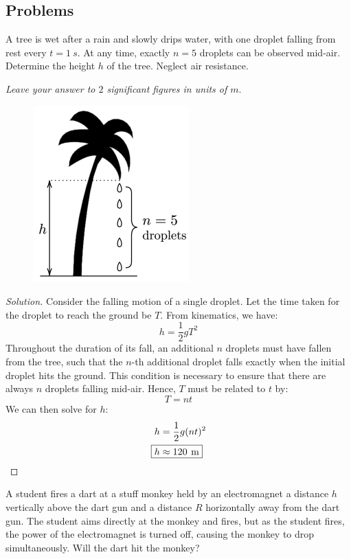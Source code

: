 \subsection{Problems}
\begin{prbm}
A tree is wet after a rain and slowly drips water, with one droplet falling from rest every $t=1\:\unit{s}$. At any time, exactly $n=5$ droplets can be observed mid-air. Determine the height $h$ of the tree. Neglect air resistance.

\textit{Leave your answer to $2$ significant figures in units of $\unit{m}$}.

\begin{figure}[H]
    \centering
    \includegraphics{images/Wet_Tree.png}
\end{figure}
\end{prbm}

\begin{proof}[Solution]
Consider the falling motion of a single droplet. Let the time taken for the droplet to reach the ground be $T$. From kinematics, we have:
\[ h = \frac{1}{2}gT^2 \]
Throughout the duration of its fall, an additional $n$ droplets must have fallen from the tree, such that the $n$-th additional droplet falls exactly when the initial droplet hits the ground. This condition is necessary to ensure that there are always $n$ droplets falling mid-air. Hence, $T$ must be related to $t$ by:
\[ T = nt \]
We can then solve for $h$:
\begin{align*}
h &= \frac{1}{2}g(nt)^2 \\
\Aboxed{h &\approx 120\:\unit{m}}
\end{align*}
\end{proof}
\pagebreak

\begin{prbm}
A student fires a dart at a stuff monkey held by an electromagnet a distance $h$ vertically above the dart gun and a distance $R$ horizontally away from the dart gun. The student aims directly at the monkey and fires, but as the student fires, the power of the electromagnet is turned off, causing the monkey to drop simultaneously. Will the dart hit the monkey?
\end{prbm}


